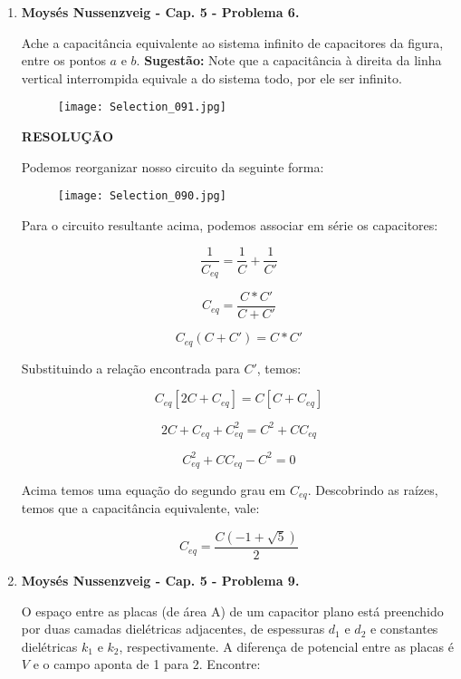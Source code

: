\documentclass[11pt,a4paper]{article}
\begin{document}
\begin{enumerate}
\begin{enumerate}
\end{enumerate}


\item \textbf{Moysés Nussenzveig - Cap. 5 - Problema 6.}

Ache a capacitância equivalente ao sistema infinito de capacitores da figura, entre os pontos $a$ e $b$. \textbf{Sugestão:} Note que a capacitância à direita da linha vertical interrompida equivale a do sistema todo, por ele ser infinito. 

\begin{figure}[h]	
\centering %
\texttt{[image: Selection\_091.jpg]} 
\end{figure}

\textbf{RESOLUÇÃO}

Podemos reorganizar nosso circuito da seguinte forma:

\begin{figure}[h]	
\centering %
\texttt{[image: Selection\_090.jpg]} 
\end{figure}

Para o circuito resultante acima, podemos associar em série os capacitores:

$$\displaystyle\dfrac{1}{C_{eq}} = \displaystyle\dfrac{1}{C} + \displaystyle\dfrac{1}{C'}$$

$$C_{eq} = \displaystyle\dfrac{C \ast C' }{C + C'}$$

$$C_{eq}(C + C') = C \ast C'$$

Substituindo a relação encontrada para $C'$, temos:

$$C_{eq}[2C + C_{eq}] = C[C + C_{eq}]$$

$$2C + C_{eq} + C_{eq}^2 = C^2 + C C_{eq}$$

$$C_{eq}^2 + C C_{eq} - C^2 = 0$$

Acima temos uma equação do segundo grau em $C_{eq}$. Descobrindo as raízes, temos que a capacitância equivalente, vale:

$$C_{eq} = \displaystyle\dfrac{C(-1 + \sqrt{5})}{2}$$

\item \textbf{Moysés Nussenzveig - Cap. 5 - Problema 9.}

O espaço entre as placas (de área A) de um capacitor plano está preenchido por duas camadas dielétricas adjacentes, de espessuras $d_1$ e $d_2$ e constantes dielétricas $k_1$ e $k_2$, respectivamente. A diferença de potencial entre as placas é $V$ e o campo aponta de 1 para 2. Encontre:


\end{enumerate}
\end{document}
